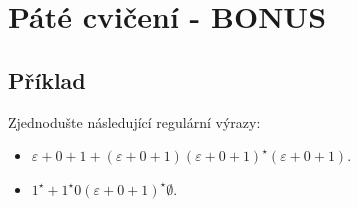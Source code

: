 \section{Páté cvičení - BONUS}

\subsection{Příklad}
Zjednodušte následující regulární výrazy:
\begin{itemize}[a), noitemsep]
    \item $\varepsilon + 0 + 1 + (\varepsilon + 0 + 1)(\varepsilon + 0 + 1)^\star (\varepsilon + 0 + 1)$.
    \item $1^\star + 1^\star 0 (\varepsilon + 0 + 1)^\star \emptyset$.
\end{itemize}
